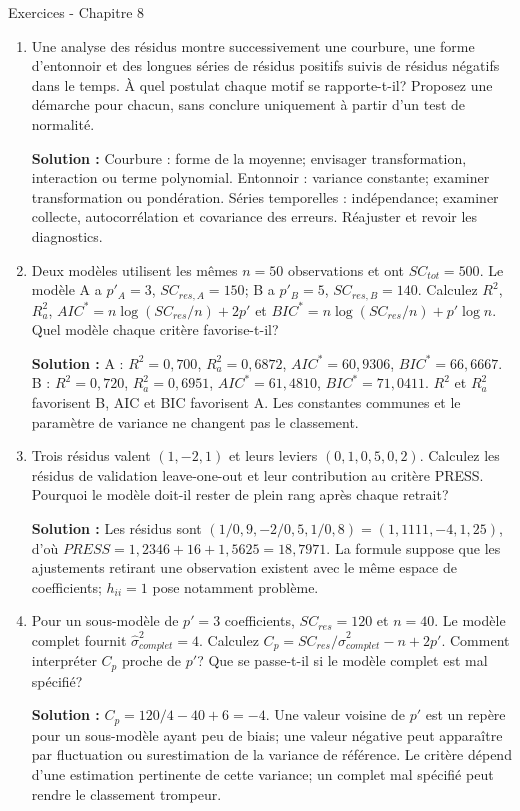 \documentclass[letterpaper,11pt]{article}
\newcommand{\prof}[1]{\ifdefined\avecsolutions\par{\color{blue}\textbf{Solution :} #1}\par\fi}
\begin{document}
\begin{center}{\Large Exercices - Chapitre 8}\end{center}
\begin{enumerate}[leftmargin=*,wide,label=\bfseries Exercice \arabic*:]
\item Une analyse des résidus montre successivement une courbure, une forme d'entonnoir et des longues séries de résidus positifs suivis de résidus négatifs dans le temps. À quel postulat chaque motif se rapporte-t-il? Proposez une démarche pour chacun, sans conclure uniquement à partir d'un test de normalité.
\prof{Courbure : forme de la moyenne; envisager transformation, interaction ou terme polynomial. Entonnoir : variance constante; examiner transformation ou pondération. Séries temporelles : indépendance; examiner collecte, autocorrélation et covariance des erreurs. Réajuster et revoir les diagnostics.}
\item Deux modèles utilisent les mêmes $n=50$ observations et ont $SC_{tot}=500$. Le modèle A a $p'_A=3$, $SC_{res,A}=150$; B a $p'_B=5$, $SC_{res,B}=140$.
Calculez $R^2$, $R_a^2$, $AIC^*=n\log(SC_{res}/n)+2p'$ et $BIC^*=n\log(SC_{res}/n)+p'\log n$. Quel modèle chaque critère favorise-t-il?
\prof{A : $R^2=0{,}700$, $R_a^2=0{,}6872$, $AIC^*=60{,}9306$, $BIC^*=66{,}6667$. B : $R^2=0{,}720$, $R_a^2=0{,}6951$, $AIC^*=61{,}4810$, $BIC^*=71{,}0411$. $R^2$ et $R_a^2$ favorisent B, AIC et BIC favorisent A. Les constantes communes et le paramètre de variance ne changent pas le classement.}
\item Trois résidus valent $(1,-2,1)$ et leurs leviers $(0{,}1,0{,}5,0{,}2)$. Calculez les résidus de validation leave-one-out et leur contribution au critère PRESS. Pourquoi le modèle doit-il rester de plein rang après chaque retrait?
\prof{Les résidus sont $(1/0{,}9,-2/0{,}5,1/0{,}8)=(1{,}1111,-4,1{,}25)$, d'où $PRESS=1{,}2346+16+1{,}5625=18{,}7971$. La formule suppose que les ajustements retirant une observation existent avec le même espace de coefficients; $h_{ii}=1$ pose notamment problème.}
\item Pour un sous-modèle de $p'=3$ coefficients, $SC_{res}=120$ et $n=40$. Le modèle complet fournit $\hat\sigma^2_{complet}=4$. Calculez $C_p=SC_{res}/\hat\sigma^2_{complet}-n+2p'$. Comment interpréter $C_p$ proche de $p'$? Que se passe-t-il si le modèle complet est mal spécifié?
\prof{$C_p=120/4-40+6=-4$. Une valeur voisine de $p'$ est un repère pour un sous-modèle ayant peu de biais; une valeur négative peut apparaître par fluctuation ou surestimation de la variance de référence. Le critère dépend d'une estimation pertinente de cette variance; un complet mal spécifié peut rendre le classement trompeur.}

\end{enumerate}
\end{document}
